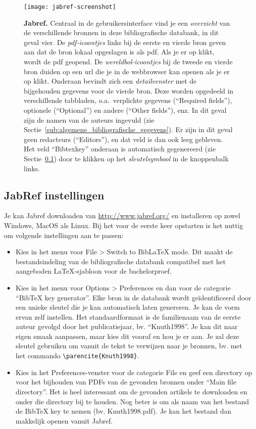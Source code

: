 \begin{figure}
  \centering
  \texttt{[image: jabref-screenshot]}
  \caption[Jabref]{\textbf{Jabref.} Centraal in de gebruikersinterface vind je een \emph{overzicht} van de verschillende bronnen in deze bibliografische databank, in dit geval vier. De \emph{pdf-icoontjes} links bij de eerste en vierde bron geven aan dat de bron lokaal opgeslagen is als pdf. Als je er op klikt, wordt de pdf geopend. De \emph{wereldbol-icoontjes} bij de tweede en vierde bron duiden op een url die je in de webbrowser kan openen als je er op klikt. Onderaan bevindt zich een \emph{detailvenster} met de bijgehouden gegevens voor de vierde bron. Deze worden opgedeeld in verschillende tabbladen, o.a.~verplichte gegevens (``Required fields''), optionele (``Optional'') en andere (``Other fields''), enz. In dit geval zijn de namen van de auteurs ingevuld (zie Sectie~\ref{sub:algemene_bibliografische_gegevens}). Er zijn in dit geval geen redacteurs (``Editors''), en dat veld is dan ook leeg gebleven. Het veld ``Bibtexkey'' onderaan is automatisch gegenereerd (zie Sectie~\ref{sub:jabref_instellingen}) door te klikken op het \emph{sleutelsymbool} in de knoppenbalk links.}
  \label{fig:jabref}
\end{figure}

\subsection{JabRef instellingen}
\label{sub:jabref_instellingen}


Je kan Jabref downloaden van \url{http://www.jabref.org/} en installeren op zowel Windows, MacOS als Linux. Bij het voor de eerste keer opstarten is het nuttig om volgende instellingen aan te passen:

\begin{itemize}
  \item Kies in het menu voor File > Switch to BibLaTeX mode. Dit maakt de bestandsindeling van de bibliografische databank compatibel met het aangeboden {\LaTeX}-sjabloon voor de bachelorproef.
  \item Kies in het menu voor Options > Preferences en dan voor de categorie ``BibTeX key generator''. Elke bron in de databank wordt geïdentificeerd door een unieke sleutel die je kan automatisch laten genereren. Je kan de vorm ervan zelf instellen. Het standaardformaat is de familienaam van de eerste auteur gevolgd door het publicatiejaar, bv. ``Knuth1998''. Je kan dit naar eigen smaak aanpassen, maar kies dit vooraf en hou je er aan. Je zal deze sleutel gebruiken om vanuit de tekst te verwijzen naar je bronnen, bv. met het commando \verb|\parencite{Knuth1998}|.
  \item Kies in het Preferences-venster voor de categorie File en geef een directory op voor het bijhouden van PDFs van de gevonden bronnen onder ``Main file directory''. Het is heel interessant om de gevonden artikels te downloaden en onder die directory bij te houden. Nog beter is om als naam van het bestand de BibTeX key te nemen (bv. Knuth1998.pdf). Je kan het bestand dan makkelijk openen vanuit Jabref.
\end{itemize}

